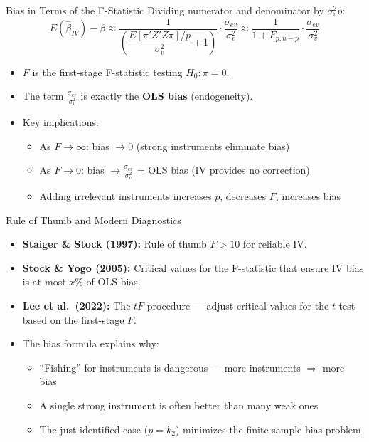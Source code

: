 \documentclass[aspectratio=169, handout]{beamer}
\numberwithin{equation}{section}
\begin{document}
\begin{frame}{Bias in Terms of the F-Statistic}
Dividing numerator and denominator by $\sigma_v^2 p$:
$$E(\hat{\beta}_{IV})-\beta\approx \frac{1}{\left(\dfrac{E[\pi'Z'Z\pi]/p}{\sigma^2_v}+1\right)}\cdot\frac{\sigma_{ev}}{\sigma_v^2}\approx \frac{1}{1+F_{p,n-p}}\cdot\frac{\sigma_{ev}}{\sigma_v^2}$$
\begin{itemize}
\item $F$ is the first-stage F-statistic testing $H_0:\pi=0$.
\item The term $\frac{\sigma_{ev}}{\sigma_v^2}$ is exactly the \textbf{OLS bias} (endogeneity).
\item Key implications:
\begin{itemize}
\item As $F\rightarrow\infty$: bias $\rightarrow 0$ (strong instruments eliminate bias)
\item As $F\rightarrow 0$: bias $\rightarrow \frac{\sigma_{ev}}{\sigma_v^2}$ = OLS bias (IV provides no correction)
\item Adding irrelevant instruments increases $p$, decreases $F$, \alert{increases bias}
\end{itemize}
\end{itemize}
\end{frame}


\begin{frame}{Rule of Thumb and Modern Diagnostics}
\begin{itemize}
\item \textbf{Staiger \& Stock (1997):} Rule of thumb $F>10$ for reliable IV.
\item \textbf{Stock \& Yogo (2005):} Critical values for the F-statistic that ensure IV bias is at most $x\%$ of OLS bias.
\item \textbf{Lee et al.\ (2022):} The $tF$ procedure --- adjust critical values for the $t$-test based on the first-stage $F$.
\item The bias formula explains why:
\begin{itemize}
\item ``Fishing'' for instruments is dangerous --- more instruments $\Rightarrow$ more bias
\item A single strong instrument is often better than many weak ones
\item The just-identified case ($p=k_2$) minimizes the finite-sample bias problem
\end{itemize}
\end{itemize}
\end{frame}
\end{document}
